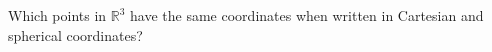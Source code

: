 \begin{problem}
Which points in $\mathbb{R}^3$ have the same coordinates when written in Cartesian and spherical coordinates?
\end{problem}
